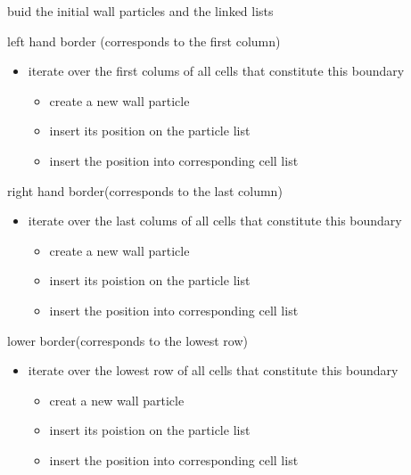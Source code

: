 buid the initial wall particles and the linked lists 



left hand border (corresponds to the first column)

\begin{itemize}
\item iterate over the first colums of all cells that constitute this boundary

\begin{itemize}
\item create a new wall particle

\item insert its position on the particle list

\item insert the position into corresponding cell list\end{itemize}
\end{itemize}


right hand border(corresponds to the last column)

\begin{itemize}
\item iterate over the last colums of all cells that constitute this boundary

\begin{itemize}
\item create a new wall particle

\item insert its poistion on the particle list

\item insert the position into corresponding cell list\end{itemize}
\end{itemize}


lower border(corresponds to the lowest row)

\begin{itemize}
\item iterate over the lowest row of all cells that constitute this boundary

\begin{itemize}
\item creat a new wall particle

\item insert its poistion on the particle list

\item insert the position into corresponding cell list\end{itemize}
\end{itemize}


